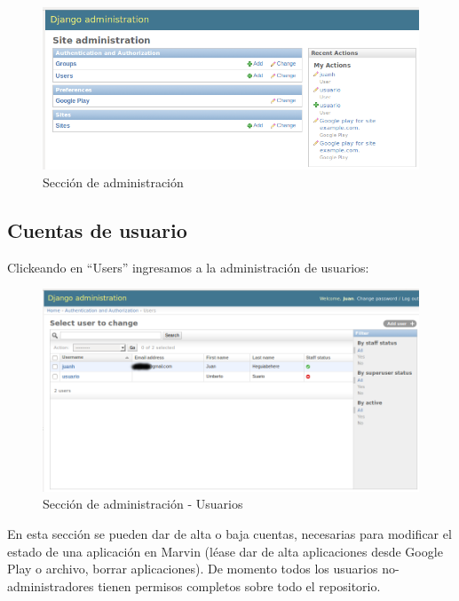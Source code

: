 \documentclass[11pt]{article}
\begin{document}
\begin{figure}[H]
\begin{center}
\includegraphics[width=\textwidth]{graphics/marvin1.png}
\caption{Sección de administración} \label{admin}
\end{center}
\end{figure}
\subsection{Cuentas de usuario}
Clickeando en ``Users'' ingresamos a la administración de usuarios:
\begin{figure}[H]
\begin{center}
\includegraphics[width=\textwidth]{graphics/marvin2.png}
\caption{Sección de administración - Usuarios} \label{adminus}
\end{center}
\end{figure}
En esta sección se pueden dar de alta o baja cuentas, necesarias para modificar el estado de una aplicación en Marvin (léase dar de alta aplicaciones desde Google Play o archivo, borrar aplicaciones). De momento todos los usuarios no-administradores tienen permisos completos sobre todo el repositorio. 
\end{document}

